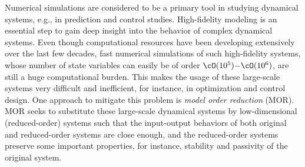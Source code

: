 Numerical simulations are considered to be a primary tool in studying dynamical systems, e.g., in prediction and control studies. High-fidelity modeling is an  essential step to gain deep insight into the behavior of complex  dynamical systems.  Even though computational resources have been developing extensively over the last few decades,  fast numerical simulations of such high-fidelity systems, whose number of state variables can easily be of order $\cO(10^5){-}\cO(10^6)$,  are still a huge computational burden. This makes the usage of these large-scale systems very difficult and inefficient, for instance,  in optimization and control design. One approach to mitigate this problem is \emph{model order reduction} (MOR). MOR seeks to substitute these large-scale dynamical systems by  low-dimensional (reduced-order) systems such that the input-output behaviors of  both original and reduced-order systems are close enough, and the reduced-order systems preserve some important properties, for instance, stability and passivity of the original system.

